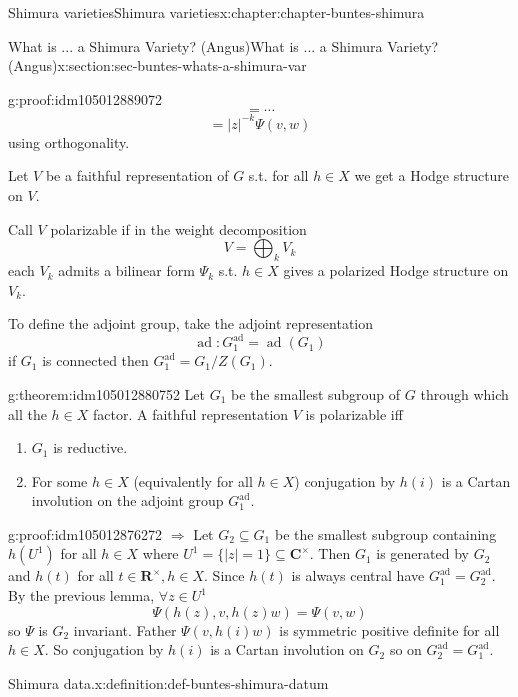 \documentclass[oneside,10pt,]{book}
\numberwithin{equation}{section}
\newcommand{\RR}{\mathbf{R}}
\newcommand{\CC}{\mathbf{C}}
\DeclareMathOperator{\ad}{ad}
\begin{document}
\begin{chapterptx}{Shimura varieties}{}{Shimura varieties}{}{}{x:chapter:chapter-buntes-shimura}
\begin{sectionptx}{What is ... a Shimura Variety? (Angus)}{}{What is ... a Shimura Variety? (Angus)}{}{}{x:section:sec-buntes-whats-a-shimura-var}
\begin{proofptx}{}{g:proof:idm105012889072}
\begin{equation*}
= \cdots
\end{equation*}
%
\begin{equation*}
= |z|^{-k} \Psi(v,w)
\end{equation*}
using orthogonality.%
\end{proofptx}
Let \(V \) be a faithful representation of \(G \) s.t. for all \(h\in X\) we get  a Hodge structure on \(V\).%
\par
Call \(V\) polarizable if in the weight decomposition%
\begin{equation*}
V = \bigoplus_k V_k
\end{equation*}
each \(V_k\) admits a bilinear form \(\Psi_k\) s.t. \(h \in X\) gives a polarized Hodge structure on \(V_k\).%
\par
To define the adjoint group, take the adjoint representation%
\begin{equation*}
\ad \colon G_1^{\ad} = \ad(G_1)
\end{equation*}
if \(G_1\) is connected then \(G_1^{\ad} = G_1 /Z(G_1)\).%
\begin{theorem}{}{}{g:theorem:idm105012880752}%
Let \(G_1\) be the smallest subgroup of \(G\) through  which all the \(h \in X\) factor. A faithful representation \(V\) is polarizable iff%
\begin{enumerate}
\item{}\(G_1\) is reductive.%
\item{}For some \(h \in X\) (equivalently for all \(h \in X\)) conjugation by \(h(i)\) is a Cartan involution on the adjoint group \(G_1^{\ad}\).%
\end{enumerate}
%
\end{theorem}
\begin{proofptx}{}{g:proof:idm105012876272}
\(\Rightarrow\) Let \(G_2 \subseteq G_1\) be the smallest subgroup containing \(h(U^1)\) for all \(h \in X\) where \(U^1 = \{|z| = 1\} \subseteq \CC^\times\). Then \(G_1\) is generated by \(G_2\) and \(h(t)\) for all \(t \in \RR^\times, h \in X\). Since \(h(t)\) is always central have \(G_1^{\ad}=  G_2^{\ad}\). By the previous lemma, \(\forall z  \in U^1\)%
\begin{equation*}
\Psi(h(z), v, h(z) w) = \Psi(v,w)
\end{equation*}
so \(\Psi\) is \(G_2\) invariant. Father \(\Psi(v, h(i) w)\) is symmetric positive definite for all \(h \in X\). So conjugation by \(h(i)\) is a Cartan involution on \(G_2\) so on \(G_2^{\ad} = G_1^{\ad}\).%
\end{proofptx}
\begin{definition}{Shimura data.}{x:definition:def-buntes-shimura-datum}%

\end{definition}
\end{sectionptx}
\end{chapterptx}
\end{document}
